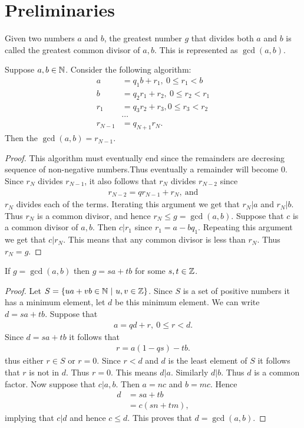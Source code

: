\section{Preliminaries}
\begin{definition}
  Given two numbers $a$ and $b$, the greatest number $g$ that divides both $a$ and $b$ is called the greatest common divisor of $a,b$. This is represented as $\gcd(a,b)$.
\end{definition}
\begin{theorem}
  Suppose $a,b\in \mathbb{N}$. Consider the following algorithm:
  \begin{align*}
    a &= q_1 b + r_1,\ 0 \leq r_1 < b\\
    b &= q_2 r_1 + r_2,\ 0\leq r_2< r_1\\
    r_1 &= q_3 r_2 + r_3, 0\leq r_3 < r_2\\
    &\cdots\\
    r_{N-1} &= q_{N+1}r_{N}.
  \end{align*}
  Then the $\gcd(a,b) = r_{N-1}$.
\end{theorem}
\begin{proof} 
  This algorithm must eventually end since the remainders are decresing sequence of non-negative numbers.Thus eventually a remainder will become $0$. Since $r_N$ divides $r_{N-1}$, it also follows that $r_{N}$ divides $r_{N-2}$ since
  \begin{align*}
    r_{N-2} = q r_{N-1} + r_{N},\ \text{and}
  \end{align*}
  $r_N$ divides each of the terms. Iterating this argument we get that $r_N | a$ and $r_N | b$. Thus $r_N$ is a common divisor, and hence $r_N \leq g = \gcd(a,b)$. Suppose that $c$ is a common divisor of $a,b$. Then $c | r_1$ since $r_1 = a-bq_1$. Repeating this argument we get that $c|r_N$. This means that any common divisor is less than $r_N$. Thus $r_N = g$.  
\end{proof}
\begin{theorem}
  If $g=\gcd(a,b)$ then $g = sa+tb$ for some $s,t\in \mathbb{Z}$. 
\end{theorem}
\begin{proof}
  Let $S= \{ua+vb\in \N\ |\ u,v\in \Z\}$. Since $S$ is a set of positive numbers it has a minimum element, let $d$ be this minimum element. We can write $d=sa+tb$. Suppose that
  \begin{align*}
    a = qd +r,\ 0\leq r< d.
  \end{align*}
  Since $d = sa+tb$ it follows that
  \begin{align*}
    r = a(1-qs) -tb.
  \end{align*}
  thus either $r\in S$ or $r=0$. Since $r<d$ and $d$ is the least element of $S$ it follows that $r$ is not in $d$. Thus $r=0$. This means $d | a$. Similarly $d | b$. Thus $d$ is a common factor. Now suppose that $c|a,b$. Then $a=nc$ and $b=mc$. Hence
  \begin{align*}
    d &= sa + tb\\
      &= c(sn+tm),
  \end{align*}
  implying that $c|d$ and hence $c\leq d$. This proves that $d = \gcd(a,b)$.
\end{proof}
